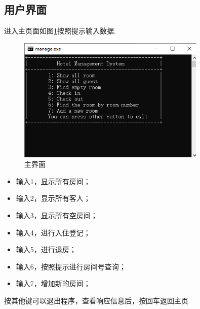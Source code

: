 \documentclass[UTF8]{ctexart}
\begin{document}
  \subsection{用户界面}
    进入主页面如图\ref{fig:home}按照提示输入数据.
    \begin{figure}[H]
      \centering
      \includegraphics[width=0.8\textwidth]{home}
      \caption{主界面}
      \label{fig:home}
    \end{figure}
    \begin{itemize}
      \item 输入1，显示所有房间；
      \item 输入2，显示所有客人；
      \item 输入3，显示所有空房间；
      \item 输入4，进行入住登记；
      \item 输入5，进行退房；
      \item 输入6，按照提示进行房间号查询；
      \item 输入7，增加新的房间；
    \end{itemize}
    按其他键可以退出程序，查看响应信息后，按回车返回主页
\end{document}
